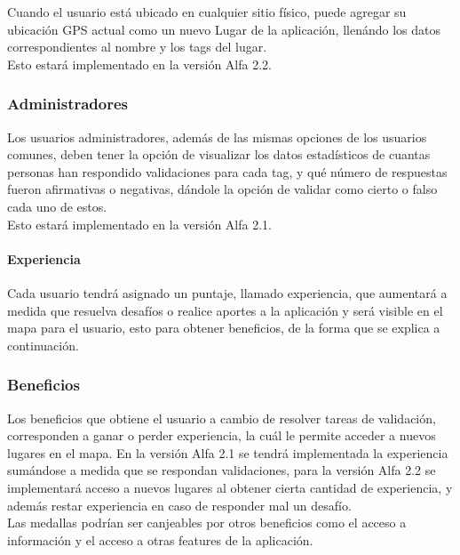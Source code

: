 \documentclass[10pt,letterpaper]{article}
\begin{document}
Cuando el usuario está ubicado en cualquier sitio físico, puede agregar su ubicación GPS actual como un nuevo Lugar de la aplicación, llenándo los datos correspondientes al nombre y los tags del lugar.\\

Esto estará implementado en la versión Alfa 2.2.\\

\subsubsection{Administradores}

Los usuarios administradores, además de las mismas opciones de los usuarios comunes, deben tener la opción de visualizar los datos estadísticos de cuantas personas han respondido validaciones para cada tag, y qué número de respuestas fueron afirmativas o negativas, dándole la opción de validar como cierto o falso cada uno de estos.\\

Esto estará implementado en la versión Alfa 2.1.\\

\paragraph{Experiencia}

Cada usuario tendrá asignado un puntaje, llamado experiencia, que aumentará a medida que resuelva desafíos o realice aportes a la aplicación y será visible en el mapa para el usuario, esto para obtener beneficios, de la forma que se explica a continuación.\\

\subsubsection{Beneficios}

Los beneficios que obtiene el usuario a cambio de resolver tareas de validación, corresponden a ganar o perder experiencia, la cuál le permite acceder a nuevos lugares en el mapa. En la versión Alfa 2.1 se tendrá implementada la experiencia sumándose a medida que se respondan validaciones, para la versión Alfa 2.2 se implementará acceso a nuevos lugares al obtener cierta cantidad de experiencia, y además restar experiencia en caso de responder mal un desafío.\\
Las medallas podrían ser canjeables por otros beneficios como el acceso a información y el acceso a otras features de la aplicación.\\
\end{document}
